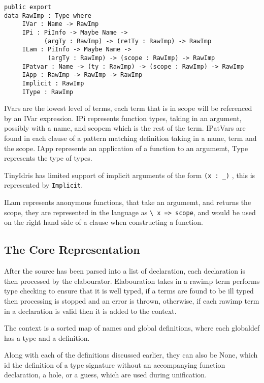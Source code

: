 \documentclass[a4paper]{article}
\begin{document}
\begin{center}
\begin{verbatim}
public export
data RawImp : Type where
	 IVar : Name -> RawImp
	 IPi : PiInfo -> Maybe Name ->
		   (argTy : RawImp) -> (retTy : RawImp) -> RawImp
	 ILam : PiInfo -> Maybe Name ->
			(argTy : RawImp) -> (scope : RawImp) -> RawImp
	 IPatvar : Name -> (ty : RawImp) -> (scope : RawImp) -> RawImp
	 IApp : RawImp -> RawImp -> RawImp
	 Implicit : RawImp
	 IType : RawImp
\end{verbatim}
\end{center}

IVars are the lowest level of terms, each term that is in scope will be 
referenced by an IVar expression. IPi represents function types, taking in 
an argument, possibly with a name, and scopem which is the rest of the 
term. IPatVars are found in each clause of a pattern matching definition 
taking in a name, term and the scope. IApp represents an application of 
a function to an argumemt, Type represents the type of types.

TinyIdris has limited support of implicit arguments of the form
 \texttt{(x : \_)} , this is represented by \texttt{Implicit}.

ILam represents anonymous functions, that take an argumemt, and returns the
scope, they are represented in the language as \texttt{\textbackslash{} x => scope}, and would
be used on the right hand side of a clause when constructing a function.

\subsection{The Core Representation}
\label{sec:orgfb16baf}

After the source has been parsed into a list of declaration, each declaration
is then processed by the elabourator. Elabouration takes in a rawimp term
performs type checking to ensure that it is well typed, if a terms are found
to be ill typed then processing is stopped and an error is thrown, otherwise, 
if each rawimp term in a declaration is valid then it is added to the context.

The context is a sorted map of names and global definitions, where 
each globaldef has a type and a definition. 

Along with each of the definitions discussed earlier, they can also be None, which 
id the definition of a type signature without an accompanying function declaration,
a hole, or a guess, which are used during unification.
\end{document}
